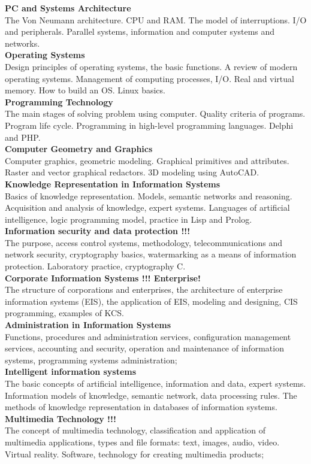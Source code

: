 \documentclass[a4paper, 12pt]{article}
\newcommand{\discipline}[1] {\textbf{#1} \\ }
\newcommand{\desc}[1] { #1 \\ }
\begin{document}
\discipline{PC and Systems Architecture}
\desc{The Von Neumann architecture. CPU and RAM. The model of interruptions. I/O and peripherals. Parallel systems, information and computer systems and networks.}

\discipline{Operating Systems}
\desc{Design principles of operating systems, the basic functions. A review of modern operating systems. Management of computing processes, I/O. Real and virtual memory. How to build an OS. Linux basics.}

\discipline{Programming Technology}
\desc{The main stages of solving problem using computer. Quality criteria of programs. Program life cycle. Programming in high-level programming languages. Delphi and PHP.}

\discipline{Computer Geometry and Graphics}
\desc{Computer graphics, geometric modeling. Graphical primitives and attributes. Raster and vector graphical redactors. 3D modeling using AutoCAD.}

\discipline{Knowledge Representation in Information Systems}
\desc{Basics of knowledge representation. Models, semantic networks and reasoning. Acquisition and analysis of knowledge, expert systems. Languages of artificial intelligence, logic programming model, practice in Lisp and Prolog.}

\discipline{Information security and data protection !!!}
\desc{The purpose, access control systems, methodology, telecommunications and network security, cryptography basics, watermarking as a means of information protection. Laboratory practice, cryptography C.}

\discipline{Corporate Information Systems !!! Enterprise!}
\desc{The structure of corporations and enterprises, the architecture of enterprise information systems (EIS), the application of EIS, modeling and designing, CIS programming, examples of KCS.}

\discipline{Administration in Information Systems}
\desc{Functions, procedures and administration services, configuration management services, accounting and security, operation and maintenance of information systems, programming systems administration;}

\discipline{Intelligent information systems}
\desc{The basic concepts of artificial intelligence, information and data, expert systems. Information models of knowledge, semantic network, data processing rules. The methods of knowledge representation in databases of information systems.}

\discipline{Multimedia Technology !!!}
\desc{The concept of multimedia technology, classification and application of multimedia applications, types and file formats: text, images, audio, video. Virtual reality. Software, technology for creating multimedia products;}
\end{document}
